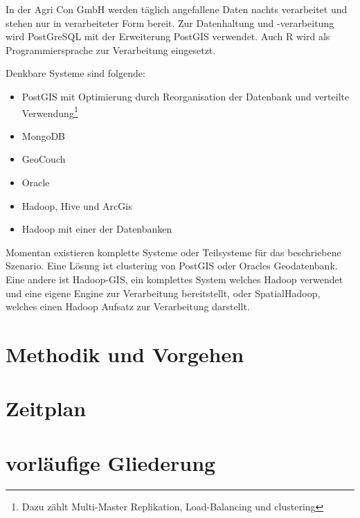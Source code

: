 \documentclass[
a4paper,     %
12pt         %
]{scrartcl}  %
\begin{document}
In der Agri Con GmbH werden täglich angefallene Daten nachts verarbeitet und stehen nur in verarbeiteter Form bereit.
Zur Datenhaltung und -verarbeitung wird PostGreSQL mit der Erweiterung PostGIS verwendet. Auch R wird als Programmiersprache zur Verarbeitung eingesetzt.

Denkbare Systeme sind folgende:
\begin{itemize}
\item PostGIS mit Optimierung durch Reorganisation der Datenbank und verteilte Verwendung\footnote{Dazu zählt Multi-Master Replikation, Load-Balancing und clustering}
\item MongoDB
\item GeoCouch
\item Oracle
\item Hadoop, Hive und ArcGis
\item Hadoop mit einer der Datenbanken
\end{itemize}


Momentan existieren komplette Systeme oder Teilsysteme für das beschriebene Szenario.
Eine Lösung ist clustering von PostGIS oder Oracles Geodatenbank.
Eine andere ist Hadoop-GIS, ein komplettes System welches Hadoop verwendet und eine eigene Engine zur Verarbeitung bereitstellt, oder SpatialHadoop, welches einen Hadoop Aufsatz zur Verarbeitung darstellt.

\section{Methodik und Vorgehen}




\section{Zeitplan}




\section{vorläufige Gliederung}
\end{document}
